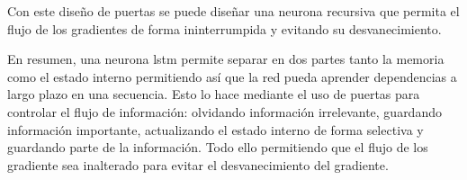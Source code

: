 Con este diseño de puertas se puede diseñar una neurona recursiva que permita el flujo de los gradientes de forma ininterrumpida y evitando su desvanecimiento.
\newline

 
 En resumen, una neurona \acrshort{lstm} permite separar en dos partes tanto la memoria como el estado interno permitiendo así que la red pueda aprender dependencias a largo plazo en una secuencia. Esto lo hace mediante el uso de puertas para controlar el flujo de información: olvidando información irrelevante, guardando información importante, actualizando el estado interno de forma selectiva y guardando parte de la información. Todo ello permitiendo que el flujo de los gradiente sea inalterado para evitar el desvanecimiento del gradiente.